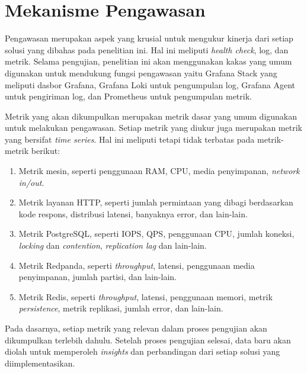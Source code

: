 \section{Mekanisme Pengawasan}

Pengawasan merupakan aspek yang krusial untuk mengukur kinerja dari setiap solusi yang dibahas pada penelitian ini. Hal ini meliputi \textit{health check}, log, dan metrik. Selama pengujian, penelitian ini akan menggunakan kakas yang umum digunakan untuk mendukung fungsi pengawasan yaitu Grafana Stack yang meliputi dasbor Grafana, Grafana Loki untuk pengumpulan log, Grafana Agent untuk pengiriman log, dan Prometheus untuk pengumpulan metrik.

Metrik yang akan dikumpulkan merupakan metrik dasar yang umum digunakan untuk melakukan pengawasan. Setiap metrik yang diukur juga merupakan metrik yang bersifat \textit{time series}. Hal ini meliputi tetapi tidak terbatas pada metrik-metrik berikut:

\begin{enumerate}
    \item Metrik mesin, seperti penggunaan RAM, CPU, media penyimpanan, \textit{network in/out}.
    \item Metrik layanan HTTP, seperti jumlah permintaan yang dibagi berdasarkan kode respons, distribusi latensi, banyaknya error, dan lain-lain.
    \item Metrik PostgreSQL, seperti IOPS, QPS, penggunaan CPU, jumlah koneksi, \textit{locking} dan \textit{contention}, \textit{replication lag} dan lain-lain.
    \item Metrik Redpanda, seperti \textit{throughput}, latensi, penggunaan media penyimpanan, jumlah partisi, dan lain-lain.
    \item Metrik Redis, seperti \textit{throughput}, latensi, penggunaan memori, metrik \textit{persistence}, metrik replikasi, jumlah error, dan lain-lain.
\end{enumerate}

Pada dasarnya, setiap metrik yang relevan dalam proses pengujian akan dikumpulkan terlebih dahulu. Setelah proses pengujian selesai, data baru akan diolah untuk memperoleh \textit{insights} dan perbandingan dari setiap solusi yang diimplementasikan.